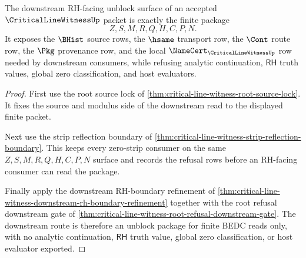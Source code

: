 \begin{theorem}
\label{thm:critical-line-witness-downstream-rh-unblock-package}
The downstream RH-facing unblock surface of an accepted $\CriticalLineWitnessUp$ packet is exactly the finite package
$$
Z,S,M,R,Q,H,C,P,N.
$$
It exposes the $\BHist$ source rows, the $\hsame$ transport row, the $\Cont$ route row, the $\Pkg$ provenance row, and the local $\NameCert_{\CriticalLineWitnessUp}$ row needed by downstream consumers, while refusing analytic continuation, $\mathsf{RH}$ truth values, global zero classification, and host evaluators.
\end{theorem}
\begin{proof}
First use the root source lock of \autoref{thm:critical-line-witness-root-source-lock}. It fixes the source and modulus side of the downstream read to the displayed finite packet.

Next use the strip reflection boundary of \autoref{thm:critical-line-witness-strip-reflection-boundary}. This keeps every zero-strip consumer on the same $Z,S,M,R,Q,H,C,P,N$ surface and records the refusal rows before an RH-facing consumer can read the package.

Finally apply the downstream RH-boundary refinement of \autoref{thm:critical-line-witness-downstream-rh-boundary-refinement} together with the root refusal downstream gate of \autoref{thm:critical-line-witness-root-refusal-downstream-gate}. The downstream route is therefore an unblock package for finite BEDC reads only, with no analytic continuation, $\mathsf{RH}$ truth value, global zero classification, or host evaluator exported.
\end{proof}

